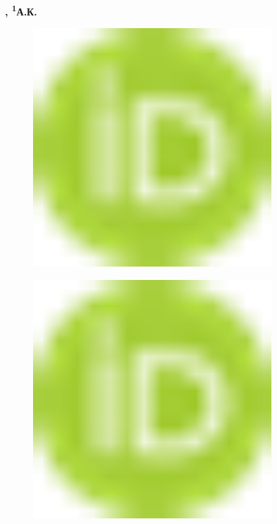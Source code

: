 {\bfseries , \textsuperscript{1}А.К.
\begin{figure}[H]
	\centering
	\includegraphics[width=0.8\textwidth]{media/ekon2/image1}
	\caption*{}
\end{figure}

\begin{figure}[H]
	\centering
	\includegraphics[width=0.8\textwidth]{media/ekon2/image1}
	\caption*{}
\end{figure}

}
